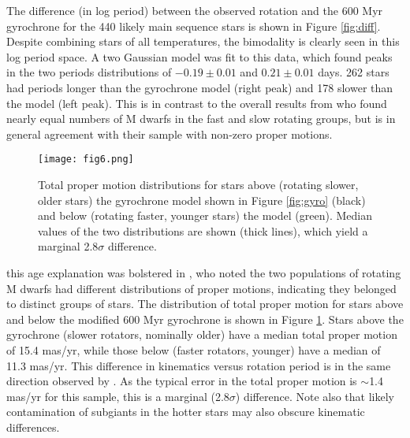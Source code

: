 \documentclass[manuscript, letterpaper]{aastex6}
\makeatletter
\let\origsection\section
\renewcommand\section{\@ifstar{\starsection}{\nostarsection}}
\newcommand\nostarsection[1]{\sectionprelude\origsection{#1}}
\newcommand\starsection[1]{\sectionprelude\origsection*{#1}}
\newcommand\sectionprelude{\vspace{1em}}
\makeatother
\begin{document}
The difference (in log period) between the observed rotation and the 600 Myr gyrochrone for the 440 likely main sequence stars is shown in Figure \ref{fig:diff}. Despite combining stars of all temperatures, the bimodality is clearly seen in this log period space. A two Gaussian model was fit to this data, which found peaks in the two periods distributions of $-0.19 \pm 0.01$ and $0.21 \pm 0.01$ days.  262 stars had periods longer than the gyrochrone model (right peak) and 178 slower than the model (left peak). This is in contrast to the overall results from \citet{mcquillan2013} who found nearly equal numbers of M dwarfs in the fast and slow rotating groups, but is in general agreement with their sample with non-zero proper motions. 




\begin{figure}[]
\centering
\texttt{[image: fig6.png]}
\caption{Total proper motion distributions for stars above (rotating slower, older stars) the gyrochrone model shown in Figure \ref{fig:gyro} (black) and below (rotating faster, younger stars) the model (green). Median values of the two distributions are shown (thick lines), which yield a marginal 2.8$\sigma$ difference.
}
\label{fig:pm}
\end{figure}

this age explanation was bolstered in \citet{mcquillan2013}, who noted the two populations of rotating M dwarfs had different distributions of proper motions, indicating they belonged to distinct groups of stars. The distribution of total proper motion for stars above and below the modified 600 Myr gyrochrone is shown in Figure \ref{fig:pm}. Stars above the gyrochrone (slower rotators, nominally older) have a median total proper motion of 15.4 mas/yr, while those below (faster rotators, younger)  have a median of 11.3 mas/yr. This difference in kinematics versus rotation period is in the same direction observed by \citet{mcquillan2013}. As the typical error in the total proper motion is $\sim$1.4 mas/yr for this sample, this is a marginal (2.8$\sigma$) difference. Note also that likely contamination of subgiants in the hotter stars may also obscure kinematic differences.



\section{Discussion}
\end{document}
